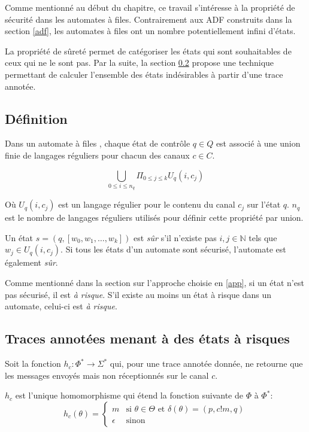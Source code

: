 Comme mentionné au début du chapitre, ce travail s'intéresse à la propriété de sécurité dans les automates à files. Contrairement aux ADF construits dans la section \ref{adf}, les automates à files ont un nombre potentiellement infini d'états.

La propriété de sûreté permet de catégoriser les états qui sont souhaitables de ceux qui ne le sont pas. Par la suite, la section \ref{ss:tracesafety} propose une technique permettant de calculer l'ensemble des états indésirables à partir d'une trace annotée.

\subsection{Définition}
Dans un automate à files \fifo, chaque état de contrôle $q\in Q$ est associé à une union finie de langages réguliers pour chacun des canaux $c\in C$.


$$\bigcup_{0 \leq i \leq n_q}\Pi_{0 \leq j \leq k}U_q(i,c_j)$$

Où $U_q(i,c_j)$ est un langage régulier pour le contenu du canal $c_j$ sur l'état $q$. $n_q$ est le nombre de langages réguliers utilisés pour définir cette propriété par union.

Un état $s=(q,[w_0,w_1,\dots,w_k])$ est \emph{sûr} s'il n'existe pas $i,j \in \mathbb{N}$ tels que $w_j \in U_q(i,c_j)$. Si tous les états d'un automate sont sécurisé, l'automate est également \emph{sûr}.

Comme mentionné dans la section sur l'approche choisie en \ref{app}, si un état n'est pas sécurisé, il est \emph{à risque}. S'il existe au moins un état à risque dans un automate, celui-ci est \emph{à risque}.



\subsection{Traces annotées menant à des états à risques}\label{ss:tracesafety}

Soit la fonction $h_c:\Phi^*\rightarrow\Sigma^*$ qui, pour une trace annotée donnée, ne retourne que les messages envoyés mais non réceptionnés sur le canal $c$.

$h_c$ est l'unique homomorphisme qui étend la fonction suivante de $\Phi$ à $\Phi^*$:
$$ h_c(\theta) = \left\{ \begin{array}{ll}
      m & \text{si } \theta\in\Theta\text{ et }\delta(\theta)=(p,c!m,q)\\
      \epsilon & \text{sinon}\end{array} \right. $$



